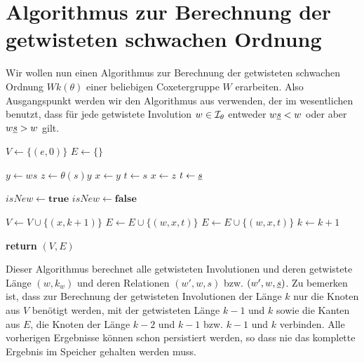 \section{Algorithmus zur Berechnung der getwisteten schwachen Ordnung}

Wir wollen nun einen Algorithmus zur Berechnung der getwisteten schwachen
Ordnung $Wk(\theta)$ einer beliebigen Coxetergruppe $W$ erarbeiten. Also
Ausgangspunkt werden wir den Algorithmus aus \cite[Algorithm 3.1.1]{haas:twoa}
verwenden, der im wesentlichen benutzt, dass für jede getwistete Involution $w
\in \mathcal{I}_{\theta}$ entweder $w \underline{s} < w$ oder aber $w \underline{s} > w$ gilt.

\begin{algo}[Algorithmus 1]
\hfill
\label{twoa1}
\begin{algorithmic}[1]
 
\State $V \gets \{(e,0)\}$
\State $E \gets \{\}$

		  \State $y \gets ws$
			\State $z \gets \theta(s)y$
				\State $x \gets y$ 
				\State $t \gets s$
			\Else
				\State $x \gets z$ 
				\State $t \gets \underline{s}$
			\EndIf
			
			\State $isNew \gets \textbf{true}$
			 
					\State $isNew \gets \textbf{false}$
				\EndIf
			\EndFor
			
				\State $V \gets V \cup \{ (x,k+1) \}$
				\State $E \gets E \cup \{ (w,x,t) \}$
			\Else
				\State $E \gets E \cup \{ (w,x,t) \}$
			\EndIf
		\EndFor
	\EndFor
	\State $k \gets k + 1$
\EndFor

\State \textbf{return} $(V,E)$
\EndProcedure
\end{algorithmic}
\end{algo}

Dieser Algorithmus berechnet alle getwisteten Involutionen und deren
getwistete Länge $(w,k_w)$ und deren Relationen $(w',w,s)$ bzw. $(w',w,\underline{s})$. Zu bemerken ist, dass zur Berechnung der ge\-twis\-te\-ten Involutionen der
Länge $k$ nur die Knoten aus $V$ benötigt werden, mit der getwisteten Länge $k-1$ und $k$ sowie
die Kanten aus $E$, die Knoten der Länge $k-2$ und $k-1$ bzw. $k-1$ und $k$
verbinden. Alle vorherigen Ergebnisse können schon persistiert werden, so dass
nie das komplette Ergebnis im Speicher gehalten werden muss.

